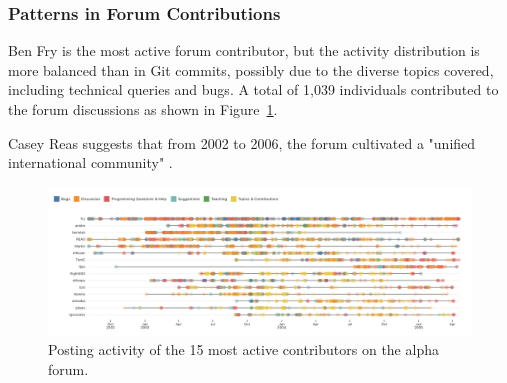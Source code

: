 \documentclass[draft]{article}
\begin{document}




\subsubsection{Patterns in Forum Contributions}

Ben Fry is the most active forum contributor, but the activity distribution is more balanced than in Git commits, possibly due to the diverse topics covered, including technical queries and bugs. A total of 1,039 individuals contributed to the forum discussions as shown in Figure~\ref{fig:processing-alpha-dot}.

Casey Reas suggests that from 2002 to 2006, the forum cultivated a "unified international community" \parencite[331]{conradGraphicDesignPostdigital2021}. 

\begin{figure}[h!]
  \centering
  \includegraphics[width=1.0\textwidth]{images/alpha-forum-top15.png}
  \caption{Posting activity of the 15 most active contributors on the alpha forum.}
  \label{fig:processing-alpha-dot}
\end{figure}
\end{document}
